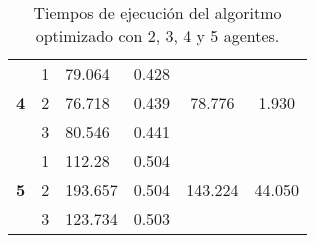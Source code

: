 \begin{table}[H]
{\begin{tabular}{|c|c|llcc|}
		\multirow{3}{*}{\textbf{4}}       & 1                                 & \multicolumn{1}{l|}{79.064}                    & \multicolumn{1}{l|}{0.428}                                  & \multicolumn{1}{c|}{\multirow{3}{*}{78.776}}            & \multirow{3}{*}{1.930}           \\ \cline{2-4}
		& 2                                 & \multicolumn{1}{l|}{76.718}                    & \multicolumn{1}{l|}{0.439}                                  & \multicolumn{1}{c|}{}                                   &                                  \\ \cline{2-4}
		& 3                                 & \multicolumn{1}{l|}{80.546}                    & \multicolumn{1}{l|}{0.441}                                  & \multicolumn{1}{c|}{}                                   &                                  \\ \hline
		\multirow{3}{*}{\textbf{5}}       & 1                                 & \multicolumn{1}{l|}{112.28}                    & \multicolumn{1}{l|}{0.504}                                  & \multicolumn{1}{c|}{\multirow{3}{*}{143.224}}           & \multirow{3}{*}{44.050}          \\ \cline{2-4}
		& 2                                 & \multicolumn{1}{l|}{193.657}                   & \multicolumn{1}{l|}{0.504}                                  & \multicolumn{1}{c|}{}                                   &                                  \\ \cline{2-4}
		& 3                                 & \multicolumn{1}{l|}{123.734}                   & \multicolumn{1}{l|}{0.503}                                  & \multicolumn{1}{c|}{}                                   &                                  \\ \hline
	\end{tabular}}
	\caption{Tiempos de ejecución del algoritmo optimizado con 2, 3, 4 y 5 agentes.}
	\label{cuadro:tiempos_optim}
\end{table}

